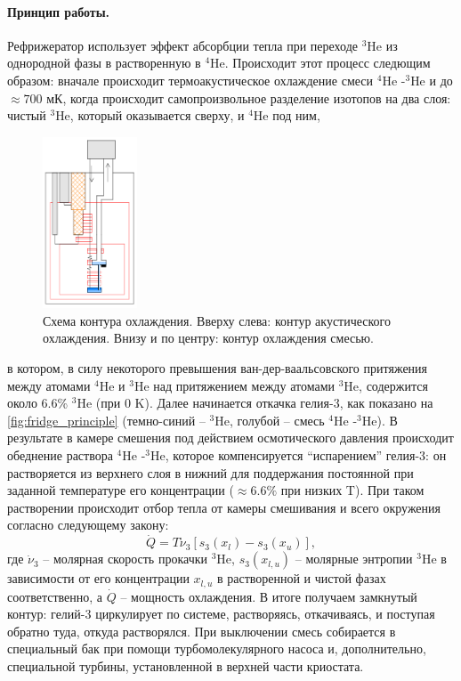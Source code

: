 \documentclass[12pt, twoside]{report}
\numberwithin{equation}{section}
\numberwithin{figure}{section}
\begin{document}
\paragraph{Принцип работы.} Рефрижератор использует эффект абсорбции тепла при переходе $^3$He из однородной фазы в растворенную в $^4$He. Происходит этот процесс следющим образом: вначале происходит термоакустическое охлаждение смеси $^4$He -$^3$He и до $\approx 700$ мК, когда происходит самопроизвольное разделение изотопов на два слоя: чистый $^3$He, который оказывается сверху, и $^4$He под ним,  
\begin{figure}
\begingroup
\captionsetup{justification=normal}
\centering
\includegraphics[width=0.25\textwidth]{Pictures/fridge_principle}
\caption{Схема контура охлаждения. Вверху слева: контур акустического охлаждения. Внизу и по центру: контур охлаждения смесью.}
\label{fig:fridge_principle}
\endgroup
\end{figure}
в котором, в силу некоторого превышения ван-дер-ваальсовского притяжения между атомами $^4$He и $^3$He над притяжением между атомами $^3$He, содержится около 6.6\% $^3$He (при 0 K).
Далее начинается откачка гелия-3, как показано на \autoref{fig:fridge_principle} (темно-синий -- $^3$He, голубой -- смесь $^4$He -$^3$He). В результате в камере смешения под действием осмотического давления происходит обеднение раствора $^4$He -$^3$He, которое компенсируется ``испарением'' гелия-3: он растворяется из верхнего слоя в нижний для поддержания постоянной при заданной температуре его концентрации ($\approx 6.6\%$ при низких T). При таком растворении происходит отбор тепла от камеры смешивания и всего окружения согласно следующему закону:
$$ \dot Q = T \dot \nu_3[s_3(x_l) - s_3(x_u)], $$
где $\dot \nu_3$ -- молярная скорость прокачки $^{3}$He, $s_3(x_{l, u})$ -- молярные энтропии $^{3}$He в зависимости от его концентрации $x_{l, u}$ в растворенной и чистой фазах соответственно, а $\dot Q$ -- мощность охлаждения. В итоге получаем замкнутый контур: гелий-3 циркулирует по системе, растворяясь, откачиваясь, и поступая обратно туда, откуда растворялся.
При выключении смесь собирается в специальный бак при помощи турбомолекулярного насоса и, дополнительно, специальной турбины, установленной в верхней части криостата. 
\end{document}
